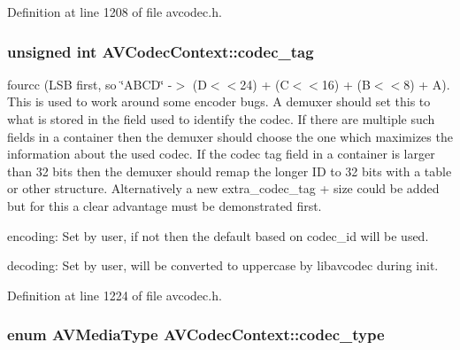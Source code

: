 Definition at line 1208 of file avcodec.\+h.

\subsubsection[{\texorpdfstring{codec\+\_\+tag}{codec_tag}}]{\setlength{\rightskip}{0pt plus 5cm}unsigned {\bf int} A\+V\+Codec\+Context\+::codec\+\_\+tag}\hypertarget{struct_a_v_codec_context_a2c974557671dd459674b170c5e64d79a}{}\label{struct_a_v_codec_context_a2c974557671dd459674b170c5e64d79a}
fourcc (L\+SB first, so \char`\"{}\+A\+B\+C\+D\char`\"{} -\/$>$ (\textquotesingle{}D\textquotesingle{}$<$$<$24) + (\textquotesingle{}C\textquotesingle{}$<$$<$16) + (\textquotesingle{}B\textquotesingle{}$<$$<$8) + \textquotesingle{}A\textquotesingle{}). This is used to work around some encoder bugs. A demuxer should set this to what is stored in the field used to identify the codec. If there are multiple such fields in a container then the demuxer should choose the one which maximizes the information about the used codec. If the codec tag field in a container is larger than 32 bits then the demuxer should remap the longer ID to 32 bits with a table or other structure. Alternatively a new extra\+\_\+codec\+\_\+tag + size could be added but for this a clear advantage must be demonstrated first.
\begin{DoxyItemize}
\item encoding\+: Set by user, if not then the default based on codec\+\_\+id will be used.
\item decoding\+: Set by user, will be converted to uppercase by libavcodec during init. 
\end{DoxyItemize}

Definition at line 1224 of file avcodec.\+h.

\subsubsection[{\texorpdfstring{codec\+\_\+type}{codec_type}}]{\setlength{\rightskip}{0pt plus 5cm}enum {\bf A\+V\+Media\+Type} A\+V\+Codec\+Context\+::codec\+\_\+type}\hypertarget{struct_a_v_codec_context_a3f99ca3115c44e6d7772c9384faf15e6}{}\label{struct_a_v_codec_context_a3f99ca3115c44e6d7772c9384faf15e6}


